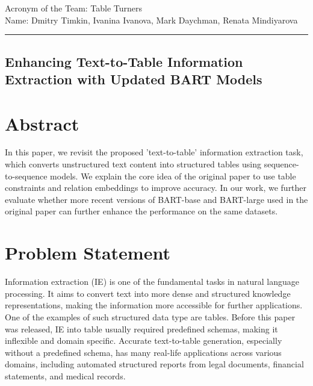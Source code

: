 \documentclass[12pt,a4paper]{article}
\begin{document}
\noindent Acronym of the Team: Table Turners\\
Name:	Dmitry Timkin, Ivanina Ivanova, Mark Daychman, Renata Mindiyarova

{\centering\rule{\linewidth}{.5pt}}


\begin{center}
\section*{Enhancing Text-to-Table Information Extraction with Updated BART Models}
\end{center}
\section*{Abstract}
In this paper, we revisit the proposed 'text-to-table' information extraction task, which converts unstructured text content into structured tables using sequence-to-sequence models. We explain the core idea of the original paper \cite{wu2022texttotablenewwayinformation} to use table constraints and relation embeddings to improve accuracy. In our work, we further evaluate whether more recent versions of BART-base and BART-large used in the original paper can further enhance the performance on the same datasets.

\section*{Problem Statement}
Information extraction (IE) is one of the fundamental tasks in natural language processing. It aims to convert text into more dense and structured knowledge representations, making the information more accessible for further applications. One of the examples of such structured data type are tables. Before this paper was released, IE into table usually required predefined schemas, making it inflexible and domain specific. Accurate text-to-table generation, especially without a predefined schema, has many real-life applications across various domains, including automated structured reports from legal documents, financial statements, and medical records. 
\ \\
\end{document}
